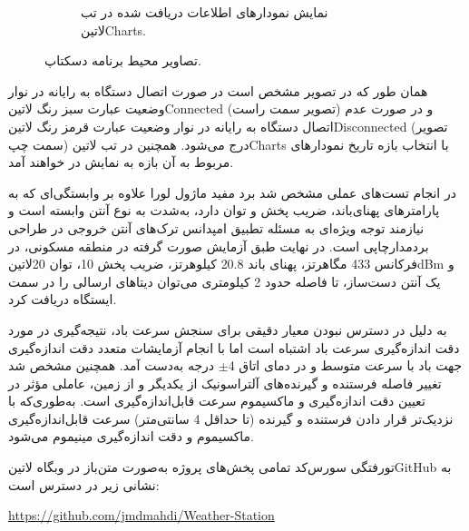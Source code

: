 \begin{figure}[!h]
\begin{subfigure}[b]{0.5\textwidth}
		\caption{نمایش نمودارهای اطلاعات دریافت شده در تب ‌لاتین{Charts}.}
		\label{fig:desktopAppCharts}
	\end{subfigure}
	\caption{تصاویر محیط برنامه دسکتاپ.}
	\label{fig:desktopApp}
\end{figure}

\noindent
همان طور که در تصویر  مشخص است در صورت اتصال دستگاه به رایانه در نوار وضعیت عبارت سبز رنگ ‌لاتین{Connected} (تصویر سمت راست) و در صورت عدم اتصال دستگاه به رایانه در نوار وضعیت عبارت قرمز رنگ ‌لاتین{Disconnected} (تصویر سمت چپ) درج می‌شود. همچنین در تب ‌لاتین{Charts} با انتخاب بازه تاریخ نمودار‌های مربوط به آن بازه به نمایش در خواهند آمد.

در انجام تست‌های عملی مشخص شد برد مفید ماژول لورا علاوه بر وابستگی‌ای که به پارامترهای پهنای‌باند، ضریب پخش و توان دارد، به‌شدت به نوع آنتن وابسته است و نیازمند توجه ویژه‌ای به مسئله تطبیق امپدانس ترک‌های آنتن خروجی در طراحی بردمدارچاپی است. در نهایت طبق آزمایش صورت گرفته در منطقه مسکونی، در فرکانس 433 مگاهرتز، پهنای باند 20.8 کیلوهرتز، ضریب پخش 10، توان 20‌لاتین{dBm} و یک آنتن دست‌­ساز، تا فاصله حدود 2 کیلومتری می‌توان دیتا‌های ارسالی را در سمت ایستگاه دریافت کرد. 


به دلیل در دسترس نبودن معیار دقیقی برای سنجش سرعت باد، نتیجه‌گیری در مورد دقت اندازه‌گیری سرعت باد اشتباه است اما با انجام آزمایشات متعدد دقت اندازه‌گیری جهت باد با سرعت متوسط و در دمای اتاق 4$\pm$ درجه به‌دست آمد. همچنین مشخص شد تغییر فاصله فرستنده و گیرنده‌های آلتراسونیک از یکدیگر و از زمین، عاملی مؤثر در تعیین دقت اندازه‌گیری و ماکسیموم سرعت قابل‌اندازه‌گیری است. به‌طوری‌که با نزدیک‌تر قرار دادن فرستنده و گیرنده (تا حداقل 4 سانتی‌متر) سرعت قابل‌اندازه‌گیری ماکسیموم و دقت اندازه‌گیری مینیموم می‌شود.


\vspace{1cm}
‌تورفتگی
{ سورس‌کد تمامی پخش‌های پروژه به‌صورت متن‌باز در وبگاه ‌لاتین{GitHub} به نشانی زیر در دسترس است:}

\begin{latin}\noindent\large
	\href{https://github.com/jmdmahdi/Weather-Station}{https://github.com/jmdmahdi/Weather-Station}
\end{latin}

